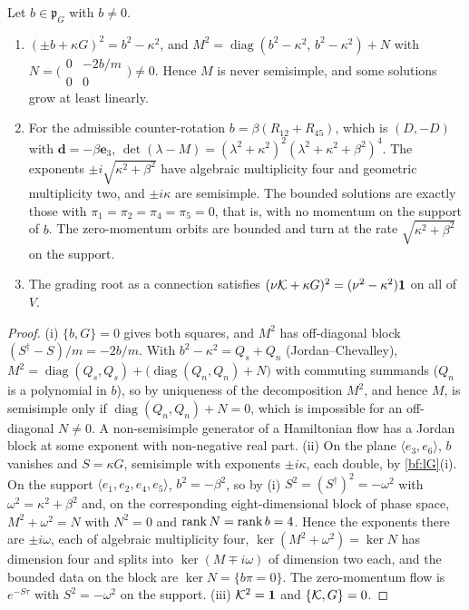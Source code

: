 \begin{theorem}
\label{bf:pG}
Let $b\in\mathfrak p_G$ with $b\neq0$.
\begin{enumerate}[label=(\roman*),leftmargin=2.2em]
\item $(\pm b+\kappa G)^2=b^2-\kappa^2$, and $M^2=\operatorname{diag}(b^2-\kappa^2,\,b^2-\kappa^2)+N$ with
$N=\bigl(\begin{smallmatrix}0&-2b/m\\0&0\end{smallmatrix}\bigr)\neq0$. Hence $M$ is never semisimple, and some solutions grow at least linearly.
\item For the admissible counter-rotation $b=\beta(R_{12}+R_{45})$, which is $(D,-D)$ with $\mathbf d=-\beta\mathbf e_3$,
$\det(\lambda-M)=(\lambda^2+\kappa^2)^2(\lambda^2+\kappa^2+\beta^2)^4$. The exponents $\pm i\sqrt{\kappa^2+\beta^2}$ have algebraic multiplicity four and
geometric multiplicity two, and $\pm i\kappa$ are semisimple. The bounded solutions are exactly those with $\pi_1=\pi_2=\pi_4=\pi_5=0$, that is, with
no momentum on the support of $b$. The zero-momentum orbits are bounded and turn at the rate $\sqrt{\kappa^2+\beta^2}$ on the support.
\item The grading root as a connection satisfies $(\nu\mathcal K+\kappa G)^2=(\nu^2-\kappa^2)\mathbf 1$ on all of $V$.
\end{enumerate}
\end{theorem}

\begin{proof}
(i) $\{b,G\}=0$ gives both squares, and $M^2$ has off-diagonal block $(S^\dagger-S)/m=-2b/m$. With $b^2-\kappa^2=Q_s+Q_n$ (Jordan--Chevalley),
$M^2=\operatorname{diag}(Q_s,Q_s)+\bigl(\operatorname{diag}(Q_n,Q_n)+N\bigr)$ with commuting summands ($Q_n$ is a polynomial in $b$), so by uniqueness of the
decomposition $M^2$, and hence $M$, is semisimple only if $\operatorname{diag}(Q_n,Q_n)+N=0$, which is impossible for an off-diagonal $N\neq0$. A
non-semisimple generator of a Hamiltonian flow has a Jordan block at some exponent with non-negative real part. (ii) On the plane
$\langle e_3,e_6\rangle$, $b$ vanishes and $S=\kappa G$, semisimple with exponents $\pm i\kappa$, each double, by \cref{bf:lG}(i). On the support
$\langle e_1,e_2,e_4,e_5\rangle$, $b^2=-\beta^2$, so by (i) $S^2=(S^\dagger)^2=-\omega^2$ with $\omega^2=\kappa^2+\beta^2$ and, on the corresponding
eight-dimensional block of phase space, $M^2+\omega^2=N$ with $N^2=0$ and $\operatorname{rank} N=\operatorname{rank} b=4$. Hence the exponents there are $\pm i\omega$, each of
algebraic multiplicity four, $\ker(M^2+\omega^2)=\ker N$ has dimension four and splits into $\ker(M\mp i\omega)$ of dimension two each, and the bounded
data on the block are $\ker N=\{b\pi=0\}$. The zero-momentum flow is $e^{-S\tau}$ with $S^2=-\omega^2$ on the support. (iii) $\mathcal K^2=\mathbf 1$ and
$\{\mathcal K,G\}=0$.
\end{proof}


